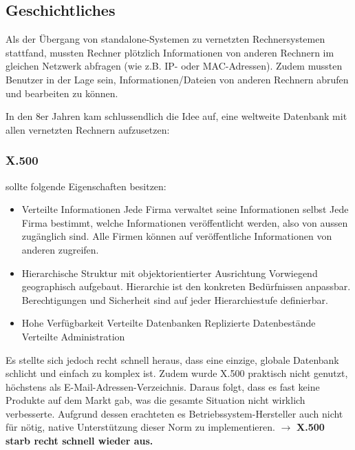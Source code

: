 \documentclass[a4paper, 11pt]{article}
\begin{document}
\subsection{Geschichtliches}
Als der Übergang von standalone-Systemen zu vernetzten Rechnersystemen stattfand, mussten Rechner plötzlich Informationen von anderen Rechnern im gleichen Netzwerk abfragen (wie z.B. IP- oder MAC-Adressen). Zudem mussten Benutzer in der Lage sein, Informationen/Dateien von anderen Rechnern abrufen und bearbeiten zu können. 

In den 8er Jahren kam schlussendlich die Idee auf, eine weltweite Datenbank mit allen vernetzten Rechnern aufzusetzen:

\subsubsection{X.500} sollte folgende Eigenschaften besitzen:
\begin{itemize}
	\item Verteilte Informationen
	\subitem Jede Firma verwaltet seine Informationen selbst
	\subitem Jede Firma bestimmt, welche Informationen veröffentlicht werden, also von aussen zugänglich sind.
	\subitem Alle Firmen können auf veröffentliche Informationen von anderen zugreifen.
	\item Hierarchische Struktur mit objektorientierter Ausrichtung
	\subitem Vorwiegend geographisch aufgebaut.
	\subitem Hierarchie ist den konkreten Bedürfnissen anpassbar.
	\subitem Berechtigungen und Sicherheit sind auf jeder Hierarchiestufe definierbar.
	\item Hohe Verfügbarkeit
	\subitem Verteilte Datenbanken 
	\subitem Replizierte Datenbestände
	\subitem Verteilte Administration
\end{itemize}

Es stellte sich jedoch recht schnell heraus, dass eine einzige, globale Datenbank schlicht und einfach zu komplex ist. Zudem wurde X.500 praktisch nicht genutzt, höchstens als E-Mail-Adressen-Verzeichnis. Daraus folgt, dass es fast keine Produkte auf dem Markt gab, was die gesamte Situation nicht wirklich verbesserte. Aufgrund dessen erachteten es Betriebssystem-Hersteller auch nicht für nötig, native Unterstützung dieser Norm zu implementieren. $\rightarrow$ \textbf{X.500 starb recht schnell wieder aus.}

\newpage
\end{document}
